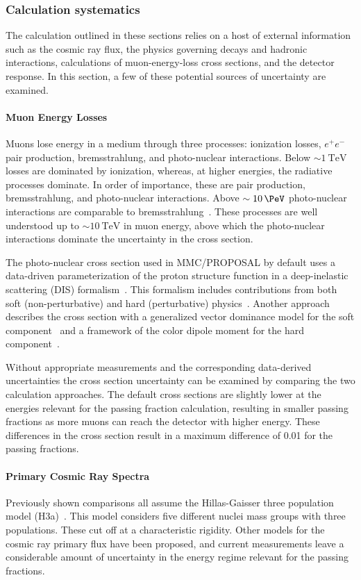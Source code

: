\subsubsection{Calculation systematics}
The calculation outlined in these sections relies on a host of external information such as the cosmic ray flux, the physics governing decays and hadronic interactions, calculations of muon-energy-loss cross sections, and the detector response.
In this section, a few of these potential sources of uncertainty are examined.

\paragraph{Muon Energy Losses}
Muons lose energy in a medium through three processes: ionization losses, $e^+e^-$ pair production, bremsstrahlung, and photo-nuclear interactions.
Below $\sim\SI{1}\TeV$ losses are dominated by ionization, whereas, at higher energies, the radiative processes dominate.
In order of importance, these are pair production, bremsstrahlung, and photo-nuclear interactions.
Above $\sim\SI{10}\PeV$ photo-nuclear interactions are comparable to bremsstrahlung~\cite{Chirkin:2004hz}.
These processes are well understood up to $\sim\SI{10}\TeV$ in muon energy, above which the photo-nuclear interactions dominate the uncertainty in the cross section.

The photo-nuclear cross section used in MMC/PROPOSAL by default uses a data-driven parameterization of the proton structure function in a deep-inelastic scattering (DIS) formalism~\cite{Abramowicz:1991xz, Abramowicz:1997ms}.
This formalism includes contributions from both soft (non-perturbative) and hard (perturbative) physics~\cite{Dutta:2000hh}.
Another approach describes the cross section with a generalized vector dominance model for the soft component~\cite{Bezrukov:1981ci} and a framework of the color dipole moment for the hard component~\cite{Bugaev:2002gy, Bugaev:2003sw}.

Without appropriate measurements and the corresponding data-derived uncertainties the cross section uncertainty can be examined by comparing the two calculation approaches.
The default cross sections are slightly lower at the energies relevant for the passing fraction calculation, resulting in smaller passing fractions as more muons can reach the detector with higher energy.
These differences in the cross section result in a maximum difference of 0.01 for the passing fractions.

\paragraph{Primary Cosmic Ray Spectra}
Previously shown comparisons all assume the Hillas-Gaisser three population model (H3a)~\cite{Gaisser:2011cc}.
This model considers five different nuclei mass groups with three populations.
These cut off at a characteristic rigidity.
Other models for the cosmic ray primary flux have been proposed, and current measurements leave a considerable amount of uncertainty in the energy regime relevant for the passing fractions.

